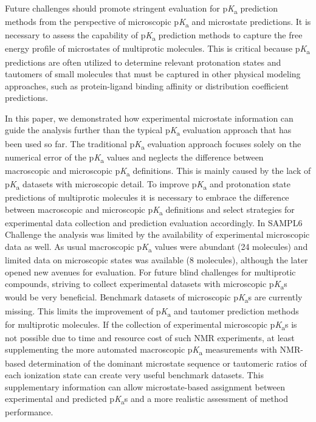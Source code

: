 \documentclass[9pt,lineno,final]{elife}
\newcommand{\pKa}{p\textit{K}\textsubscript{a}}
\begin{document}
Future challenges should promote stringent evaluation for \pKa{} prediction methods from the perspective of microscopic \pKa{} and microstate predictions.
It is necessary to assess the capability of \pKa{} prediction methods to capture the free energy profile of microstates of multiprotic molecules. 
This is critical because \pKa{} predictions are often utilized to determine relevant protonation states and tautomers of small molecules that must be captured in other physical modeling approaches, such as protein-ligand binding affinity or distribution coefficient predictions. 

In this paper, we demonstrated how experimental microstate information can guide the analysis further than the typical \pKa{} evaluation approach that has been used so far. The traditional \pKa{} evaluation approach focuses solely on the numerical error of the \pKa{} values and neglects the difference between macroscopic and microscopic \pKa{} definitions.
This is mainly caused by the lack of \pKa{} datasets with microscopic detail. 
To improve \pKa{} and protonation state predictions of multiprotic molecules it is necessary to embrace the difference between macroscopic and microscopic \pKa{} definitions and select strategies for experimental data collection and prediction evaluation accordingly.
In SAMPL6 Challenge the analysis was limited by the availability of experimental microscopic data as well. As usual macroscopic \pKa{} values were abundant (24 molecules) and limited data on microscopic states was available (8 molecules), although the later opened new avenues for evaluation. 
For future blind challenges for multiprotic compounds, striving to collect experimental datasets with microscopic \pKa{}s would be very beneficial. 
Benchmark datasets of microscopic \pKa{}s are currently missing. 
This limits the improvement of \pKa{} and tautomer prediction methods for multiprotic molecules. 
If the collection of experimental microscopic \pKa{}s is not possible due to time and resource cost of such NMR experiments, at least supplementing the more automated macroscopic \pKa{} measurements with NMR-based determination of the dominant microstate sequence or tautomeric ratios of each ionization state can create very useful benchmark datasets. This supplementary information can allow microstate-based assignment between experimental and predicted \pKa{}s and a more realistic assessment of method performance.
\end{document}
